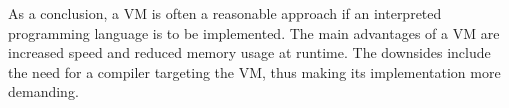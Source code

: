 As a conclusion, a VM is often a reasonable approach if an interpreted programming language is to be implemented.
The main advantages of a VM are increased speed and reduced memory usage at runtime.
The downsides include the need for a compiler targeting the VM, thus making its implementation more demanding. 
